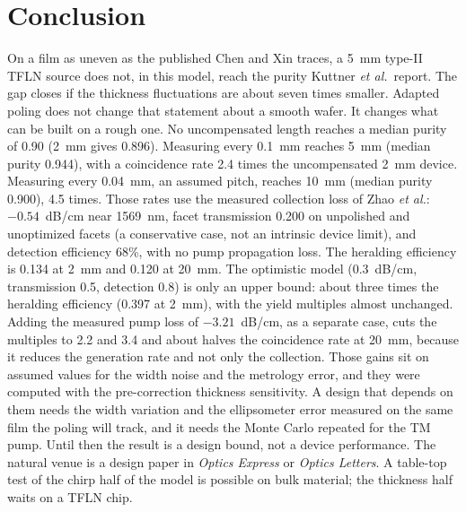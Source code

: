 \documentclass[11pt,a4paper]{article}
\begin{document}
\section{Conclusion}
On a film as uneven as the published Chen and Xin traces, a 5~mm type-II TFLN source does not, in this model, reach the purity Kuttner \emph{et al.}\ report.
The gap closes if the thickness fluctuations are about seven times smaller.
Adapted poling does not change that statement about a smooth wafer.
It changes what can be built on a rough one.
No uncompensated length reaches a median purity of 0.90 (2~mm gives 0.896).
Measuring every 0.1~mm reaches 5~mm (median purity 0.944), with a coincidence rate 2.4 times the uncompensated 2~mm device.
Measuring every 0.04~mm, an assumed pitch, reaches 10~mm (median purity 0.900), 4.5 times.
Those rates use the measured collection loss of Zhao \emph{et al.}: $-0.54$~dB/cm near 1569~nm, facet transmission 0.200 on unpolished and unoptimized facets (a conservative case, not an intrinsic device limit), and detection efficiency 68\%, with no pump propagation loss.
The heralding efficiency is 0.134 at 2~mm and 0.120 at 20~mm.
The optimistic model (0.3~dB/cm, transmission 0.5, detection 0.8) is only an upper bound: about three times the heralding efficiency (0.397 at 2~mm), with the yield multiples almost unchanged.
Adding the measured pump loss of $-3.21$~dB/cm, as a separate case, cuts the multiples to 2.2 and 3.4 and about halves the coincidence rate at 20~mm, because it reduces the generation rate and not only the collection.
Those gains sit on assumed values for the width noise and the metrology error, and they were computed with the pre-correction thickness sensitivity.
A design that depends on them needs the width variation and the ellipsometer error measured on the same film the poling will track, and it needs the Monte Carlo repeated for the TM pump.
Until then the result is a design bound, not a device performance.
The natural venue is a design paper in \emph{Optics Express} or \emph{Optics Letters}.
A table-top test of the chirp half of the model is possible on bulk material; the thickness half waits on a TFLN chip.



\end{document}
